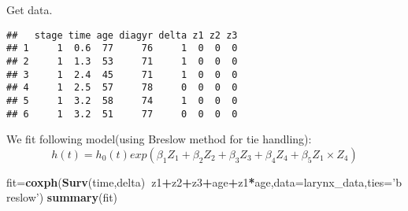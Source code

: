 \documentclass[]{article}
\newenvironment{Shaded}{\begin{snugshade}}{\end{snugshade}}
\newcommand{\KeywordTok}[1]{\textcolor[rgb]{0.13,0.29,0.53}{\textbf{#1}}}
\newcommand{\DataTypeTok}[1]{\textcolor[rgb]{0.13,0.29,0.53}{#1}}
\newcommand{\DecValTok}[1]{\textcolor[rgb]{0.00,0.00,0.81}{#1}}
\newcommand{\StringTok}[1]{\textcolor[rgb]{0.31,0.60,0.02}{#1}}
\newcommand{\OperatorTok}[1]{\textcolor[rgb]{0.81,0.36,0.00}{\textbf{#1}}}
\newcommand{\NormalTok}[1]{#1}
\begin{document}
Get data.

\begin{Shaded}
\end{Shaded}

\begin{verbatim}
##   stage time age diagyr delta z1 z2 z3
## 1     1  0.6  77     76     1  0  0  0
## 2     1  1.3  53     71     1  0  0  0
## 3     1  2.4  45     71     1  0  0  0
## 4     1  2.5  57     78     0  0  0  0
## 5     1  3.2  58     74     1  0  0  0
## 6     1  3.2  51     77     0  0  0  0
\end{verbatim}

We fit following model(using Breslow method for tie handling):
\[h(t) = h_0(t)exp(\beta_1Z_1 + \beta_2Z_2 + \beta_3Z_3 + \beta_4Z_4 + \beta_5Z_1\times Z_4)\]

\begin{Shaded}
\begin{Highlighting}[]
\NormalTok{fit=}\KeywordTok{coxph}\NormalTok{(}\KeywordTok{Surv}\NormalTok{(time,delta)}\OperatorTok{~}\NormalTok{z1}\OperatorTok{+}\NormalTok{z2}\OperatorTok{+}\NormalTok{z3}\OperatorTok{+}\NormalTok{age}\OperatorTok{+}\NormalTok{z1}\OperatorTok{*}\NormalTok{age,}\DataTypeTok{data=}\NormalTok{larynx_data,}\DataTypeTok{ties=}\StringTok{'breslow'}\NormalTok{)}
\KeywordTok{summary}\NormalTok{(fit)}
\end{Highlighting}
\end{Shaded}
\end{document}
